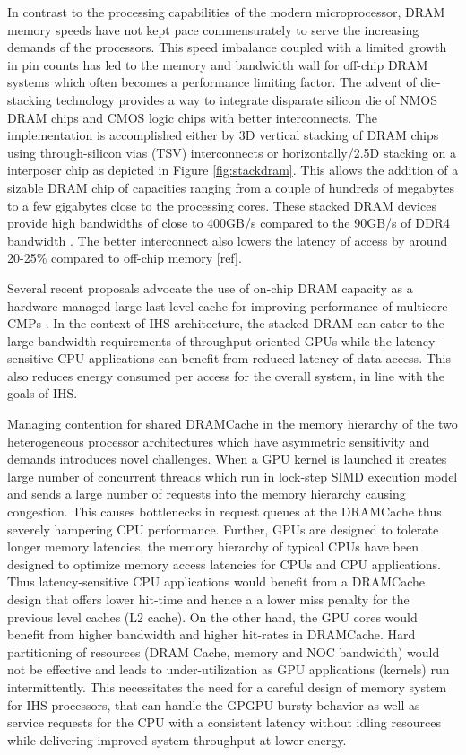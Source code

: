 \par In contrast to the processing capabilities of the modern microprocessor, DRAM memory speeds have not kept pace commensurately to serve the increasing demands of the processors. This speed imbalance coupled with a limited growth in pin counts has led to the memory and bandwidth wall \cite{memory-wall,bandwidth-wall} for off-chip DRAM systems which often becomes a performance limiting factor. The advent of die-stacking technology \cite{3d-stacking} provides a way to integrate disparate silicon die of NMOS DRAM chips and CMOS logic chips with better interconnects. The implementation is accomplished either by 3D vertical stacking of DRAM chips using through-silicon vias (TSV) interconnects or horizontally/2.5D stacking on a interposer chip as depicted in Figure \ref{fig:stackdram}. This allows the addition of a sizable DRAM chip of capacities ranging from a couple of hundreds of megabytes to a few gigabytes close to the processing cores. These stacked DRAM devices provide high bandwidths of close to 400GB/s compared to the 90GB/s of DDR4 bandwidth \cite{xeonphi}. The better interconnect also lowers the latency of access by around 20-25\% compared to off-chip memory [ref]. 
\par Several recent proposals advocate the use of on-chip DRAM capacity as a hardware managed large last level cache for improving performance of multicore CMPs \cite{alloy,bimodal,loh-hill,atcache}. In the context of IHS architecture, the stacked DRAM can cater to the large bandwidth requirements of throughput oriented GPUs while the latency-sensitive CPU applications can benefit from reduced latency of data access. This also reduces energy consumed per access for the overall system, in line with the goals of IHS.
\par Managing contention for shared DRAMCache in the memory hierarchy of the two heterogeneous processor architectures which have asymmetric sensitivity and demands introduces novel challenges. When a GPU kernel is launched it creates large number of concurrent threads which run in lock-step SIMD execution model and sends a large number of requests into the memory hierarchy causing congestion. This causes bottlenecks in request queues at the DRAMCache thus severely hampering CPU performance. Further, GPUs are designed to tolerate longer memory latencies, the memory hierarchy of typical CPUs have been designed to optimize memory access latencies for CPUs and CPU applications. 
Thus latency-sensitive CPU applications would benefit from a DRAMCache design that offers lower hit-time and hence a a lower miss penalty for the previous level caches (L2 cache). On the other hand, the GPU cores would benefit from higher bandwidth and higher hit-rates in DRAMCache. Hard partitioning of resources (DRAM Cache, memory and NOC bandwidth) would not be effective and leads to under-utilization as GPU applications (kernels) run intermittently. 
This necessitates the need for a careful design of memory system for IHS processors, that can handle the GPGPU bursty behavior as well as service requests for the CPU with a consistent latency without idling resources while delivering improved system throughput at lower energy.

